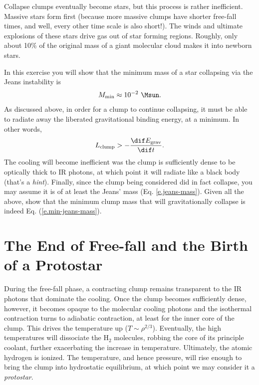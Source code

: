Collapse clumps eventually become stars, but this process is rather inefficient.
Massive stars form first (because more massive clumps have shorter free-fall times, and well, every other time scale is also short!).
The winds and ultimate explosions of these stars drive gas out of star forming regions.
Roughly, only about 10\% of the original mass of a giant molecular cloud makes it into newborn stars.

\begin{exercisebox}
  In this exercise you will show that the minimum mass of a star collapsing via the Jeans instability is
  \begin{equation}
    M_\mathrm{min} \approx 10^{-2}\ \Msun. \label{e.min-jeans-mass}
  \end{equation}
  As discussed above, in order for a clump to continue collapsing, it must be able to radiate away the liberated gravitational binding energy, at a minimum. In other words,
  \[L_\mathrm{clump} > -\frac{\dif E_\mathrm{grav}}{\dif t}.\]
  The cooling will become inefficient was the clump is sufficiently dense to be optically thick to IR photons, at which point it will radiate like a black body (that's a {\it hint}).
  Finally, since the clump being considered did in fact collapse, you may assume it is of at least the Jeans' mass (Eq. \ref{e.jeans-mass}).
  Given all the above, show that the minimum clump mass that will gravitationally collapse is indeed Eq. (\ref{e.min-jeans-mass}).
\end{exercisebox}

\section{The End of Free-fall and the Birth of a Protostar}

During the free-fall phase, a contracting clump remains transparent to the IR photons that dominate the cooling.
Once the clump becomes sufficiently dense, however, it becomes opaque to the molecular cooling photons and the isothermal contraction turns to adiabatic contraction, at least for the inner core of the clump.
This drives the temperature up ($T\sim\rho^{2/3}$).
Eventually, the high temperatures will dissociate the H$_2$ molecules, robbing the core of its principle coolant, further exacerbating the increase in temperature.
Ultimately, the atomic hydrogen is ionized.
The temperature, and hence pressure, will rise enough to bring the clump into hydrostatic equilibrium, at which point we may consider it a {\it protostar}.

